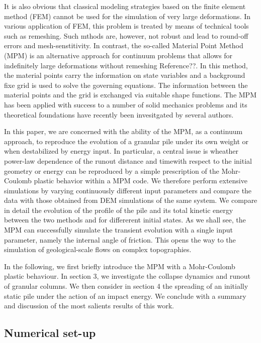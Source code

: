 \documentclass[3p,times,procedia,number]{elsarticle}
\begin{document}
It is also obvious that classical modeling strategies based on 
the finite element method (FEM) cannot be used for the 
simulation of very large deformations. In various application of FEM, 
this problem is treated by means of technical tools such 
as remeshing. Such mthods are, however, not robust and lead 
to round-off errors and mesh-senstitivity. In contrast, the so-called 
Material Point Method (MPM) is an alternative approach for 
continuum problems that allows for indefinitely large deformations 
without remeshing {Reference??}. In this method, the material points carry the information 
on state variables and a background fixe grid is used to solve the governing equations. 
The information between the material points and the grid is exchanged via 
suitable shape functions. The MPM has been applied with success to 
a number of solid mechanics problems and its theoretical foundations 
have recently been invesitgated by several authors. 

In this paper, we are concerned with the ability of the MPM, as a continuum 
approach, to reproduce the evolution of a granular pile 
under its own weight or when destabilized by energy input. In particular, 
a central issue is wheather power-law dependence of the runout distance 
and timewith respect to the initial geometry or energy can be reproduced 
by a simple prescription of the Mohr-Coulomb plastic behavior within a  
MPM code. We therefore perform extensive simulations by varying continuously 
different input parameters and compare the data with those obtained from 
DEM simulations of the same system. We compare in detail the evolution of 
the profile of the pile and its total kinetic energy between the two methods 
and for differerent initial states. As we shall see, the MPM can successfully simulate  
the transient evolution with a single input parameter, namely the 
internal angle of friction. This opens the way to the simulation of 
geological-scale flows on complex topographies.  
  
In the following, we first briefly introduce the MPM  with a Mohr-Coulomb plastic behaviour.  
In section 3, we investigate the collapse dynamics and runout of granular columns. 
We then consider in section 4 the spreading of an initially static pile 
under the action of an impact energy. We conclude with a summary and 
discussion of the most salients results of this work.   

\subsection{Numerical set-up}
\label{sec:num}
\end{document}
